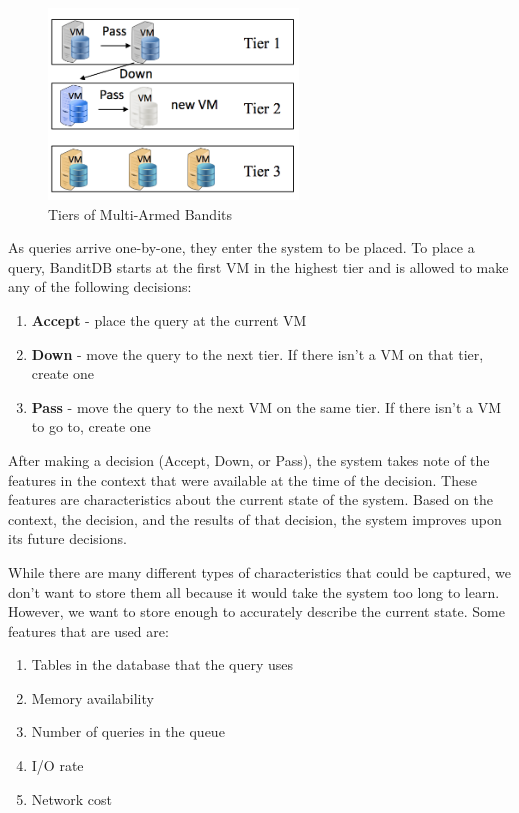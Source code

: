 \documentclass{brandiss}
\numberwithin{section}{chapter}
\numberwithin{figure}{chapter}
\theoremstyle{definition}
\theoremstyle{plain}
\theoremstyle{remark}
\begin{document}
\begin{figure}[htbp]
  \centering
  \includegraphics[height=2in]{bandit}
  \caption{Tiers of Multi-Armed Bandits}
  \label{fig:bandit}
\end{figure}

As queries arrive one-by-one, they enter the system to be placed. To place a query, BanditDB starts at the first VM in the highest tier and is allowed to make any of the following decisions:

\begin{enumerate}
\item \textbf{Accept} - place the query at the current VM
\item \textbf{Down} - move the query to the next tier. If there isn't a VM on that tier, create one
\item \textbf{Pass} - move the query to the next VM on the same tier. If there isn't a VM to go to, create one
\end{enumerate}

After making a decision (Accept, Down, or Pass), the system takes note of the features in the context that were available at the time of the decision. These features are characteristics about the current state of the system. Based on the context, the decision, and the results of that decision, the system improves upon its future decisions.

While there are many different types of characteristics that could be captured, we don't want to store them all because it would take the system too long to learn. However, we want to store enough to accurately describe the current state. Some features that are used are:

\begin{enumerate}
\item Tables in the database that the query uses
\item Memory availability
\item Number of queries in the queue
\item I/O rate
\item Network cost
\end{enumerate}
\end{document}

